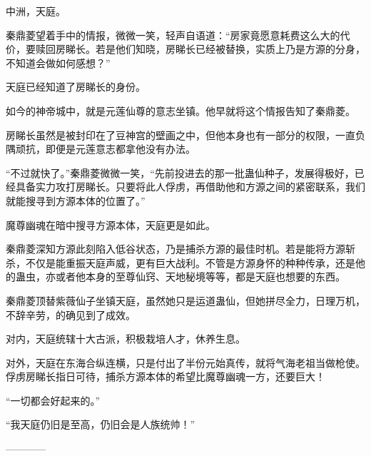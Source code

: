 \begin{this_body}
中洲，天庭。

秦鼎菱望着手中的情报，微微一笑，轻声自语道：“房家竟愿意耗费这么大的代价，要赎回房睇长。若是他们知晓，房睇长已经被替换，实质上乃是方源的分身，不知道会做如何感想？”

天庭已经知道了房睇长的身份。

如今的神帝城中，就是元莲仙尊的意志坐镇。他早就将这个情报告知了秦鼎菱。

房睇长虽然是被封印在了豆神宫的壁画之中，但他本身也有一部分的权限，一直负隅顽抗，即便是元莲意志都拿他没有办法。

“不过就快了。”秦鼎菱微微一笑，“先前投进去的那一批蛊仙种子，发展得极好，已经具备实力攻打房睇长。只要将此人俘虏，再借助他和方源之间的紧密联系，我们就能搜寻到方源本体的位置了。”

魔尊幽魂在暗中搜寻方源本体，天庭更是如此。

秦鼎菱深知方源此刻陷入低谷状态，乃是捕杀方源的最佳时机。若是能将方源斩杀，不仅是能重振天庭声威，更有巨大战利。不管是方源身怀的种种传承，还是他的蛊虫，亦或者他本身的至尊仙窍、天地秘境等等，都是天庭也想要的东西。

秦鼎菱顶替紫薇仙子坐镇天庭，虽然她只是运道蛊仙，但她拼尽全力，日理万机，不辞辛劳，的确见到了成效。

对内，天庭统辖十大古派，积极栽培人才，休养生息。

对外，天庭在东海合纵连横，只是付出了半份元始真传，就将气海老祖当做枪使。俘虏房睇长指日可待，捕杀方源本体的希望比魔尊幽魂一方，还要巨大！

“一切都会好起来的。”

“我天庭仍旧是至高，仍旧会是人族统帅！”

------------

\end{this_body}

